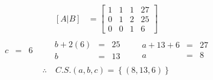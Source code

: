 \documentclass[10pt, a4paper]{article}
\begin{document}
  \begin{align*}
    \left[A|B\right]&=\left[
      \begin{array}{ccc|c}
        1 & 1 & 1 & 27 \\[1.5ex]
        0 & 1 & 2 & 25 \\[1.5ex]
        0 & 0 & 1 & 6
      \end{array}
    \right]
  \end{align*}
\begin{align*}
\begin{array}{ccc}
    \begin{array}{rcl}
        c &=& 6
    \end{array}
    & \quad
    \begin{array}{rcl}
        b + 2(6) &=& 25\\
        b &=& 13
    \end{array}
    & \quad
    \begin{array}{rcl}
        a + 13 + 6 &=& 27\\
        a &=& 8
    \end{array}
\end{array}
\end{align*}
\begin{align*}
  \therefore \ &C.S. \left(a,b,c\right) = \left\{\left(8,13,6\right)\right\}
\end{align*}
\newpage
\end{document}
